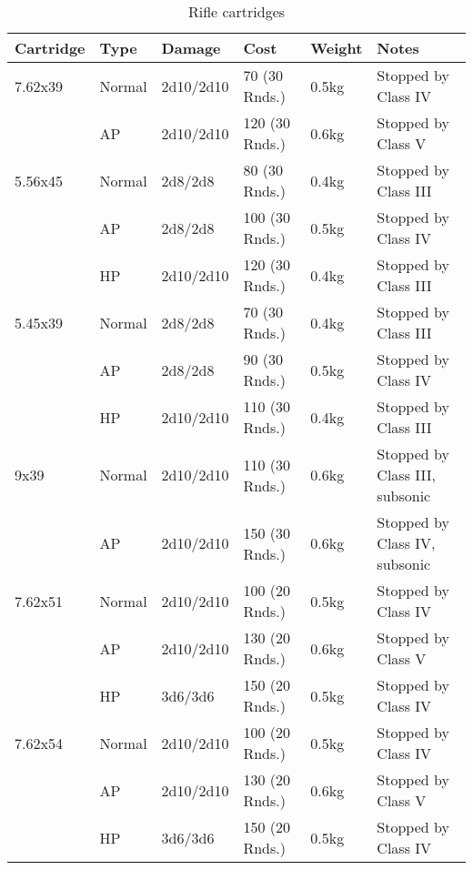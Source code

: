 \begin{table}
  \caption{Rifle cartridges}
  \label{tab:RifleCartridges}
  \begin{center}
    \begin{tabular}{| l | l | l | l | l | l |}
      \hline
      \textbf{Cartridge}  & \textbf{Type} & \textbf{Damage} &
      \textbf{Cost} & \textbf{Weight} & \textbf{Notes} \\ \hline

      7.62x39  & Normal  & 2d10/2d10  & 70 (30 Rnds.)  & 0.5kg & Stopped by Class IV \\ \hline
      \,       & AP      & 2d10/2d10  & 120 (30 Rnds.) & 0.6kg & Stopped by Class V \\ \hline
      5.56x45  & Normal  & 2d8/2d8    & 80 (30 Rnds.)  & 0.4kg & Stopped by Class III \\ \hline
      \,       & AP      & 2d8/2d8    & 100 (30 Rnds.) & 0.5kg & Stopped by Class IV \\ \hline
      \,       & HP      & 2d10/2d10  & 120 (30 Rnds.) & 0.4kg & Stopped by Class III \\ \hline
      5.45x39  & Normal  & 2d8/2d8    & 70 (30 Rnds.)  & 0.4kg & Stopped by Class III \\ \hline
      \,       & AP      & 2d8/2d8    & 90 (30 Rnds.)  & 0.5kg & Stopped by Class IV \\ \hline
      \,       & HP      & 2d10/2d10  & 110 (30 Rnds.) & 0.4kg & Stopped by Class III \\ \hline
      9x39     & Normal  & 2d10/2d10  & 110 (30 Rnds.) & 0.6kg & Stopped by Class III, subsonic \\ \hline
      \,       & AP      & 2d10/2d10  & 150 (30 Rnds.) & 0.6kg & Stopped by Class IV, subsonic \\ \hline
      7.62x51  & Normal  & 2d10/2d10  & 100 (20 Rnds.) & 0.5kg & Stopped by Class IV \\ \hline
      \,       & AP      & 2d10/2d10  & 130 (20 Rnds.) & 0.6kg & Stopped by Class V \\ \hline
      \,       & HP      & 3d6/3d6    & 150 (20 Rnds.) & 0.5kg & Stopped by Class IV \\ \hline
      7.62x54  & Normal  & 2d10/2d10  & 100 (20 Rnds.) & 0.5kg & Stopped by Class IV \\ \hline
      \,       & AP      & 2d10/2d10  & 130 (20 Rnds.) & 0.6kg & Stopped by Class V \\ \hline
      \,       & HP      & 3d6/3d6    & 150 (20 Rnds.) & 0.5kg & Stopped by Class IV \\ \hline

\end{tabular}
\end{center}
\end{table}
